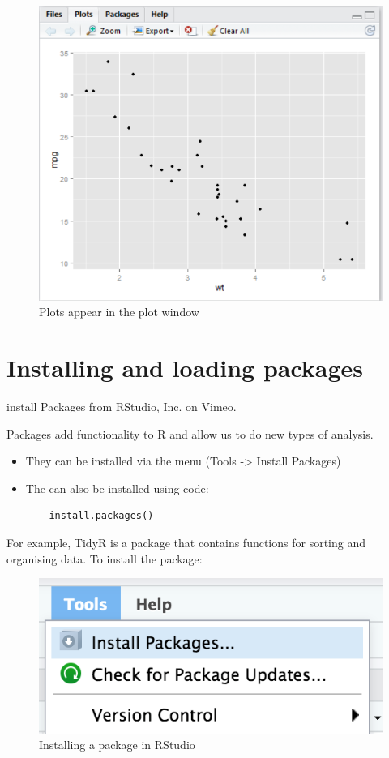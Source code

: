 \documentclass[
]{book}
\begin{document}
\begin{figure}
\centering
\includegraphics{images/plotwindow.png}
\caption{Plots appear in the plot window}
\end{figure}

\hypertarget{installing-and-loading-packages}{%
\section{Installing and loading packages}\label{installing-and-loading-packages}}

install Packages from RStudio, Inc. on Vimeo.

Packages add functionality to R and allow us to do new types of analysis.

\begin{itemize}
\item
  They can be installed via the menu (Tools -\textgreater{} Install Packages)
\item
  The can also be installed using code:

\begin{verbatim}
    install.packages()
\end{verbatim}
\end{itemize}

For example, TidyR is a package that contains functions for sorting and organising data. To install the package:

\begin{figure}
\centering
\includegraphics{images/installPackages.png}
\caption{Installing a package in RStudio}
\end{figure}
\end{document}
